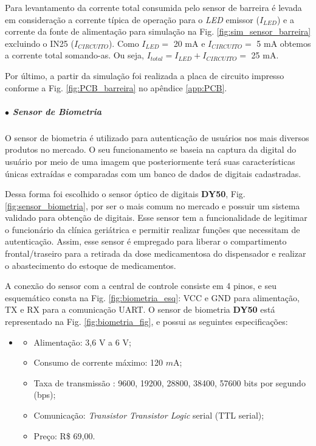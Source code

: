     Para levantamento da corrente total consumida pelo sensor de barreira é levada em consideração a corrente típica de operação para o \textit{LED} emissor ($I_{LED}$) e a corrente da fonte de alimentação para simulação na Fig. \ref{fig:sim_sensor_barreira} excluindo o IN25 ($I_{CIRCUITO}$). Como $I_{LED} =$ 20 mA e $I_{CIRCUITO} =$ 5 mA  obtemos a corrente total somando-as. Ou seja, $I_{total} = I_{LED} + I_{CIRCUITO} =$ 25 mA.  
    
    Por último, a partir da simulação foi realizada a placa de circuito impresso conforme a Fig. \ref{fig:PCB_barreira} no apêndice \ref{app:PCB}.  

    \subparagraph*{$\bullet$ Sensor de Biometria} \hfill
    
    O sensor de biometria é utilizado para autenticação de usuários nos mais diversos produtos no mercado. O seu funcionamento se baseia na captura da digital do usuário por meio de uma imagem que posteriormente terá suas características únicas extraídas e comparadas com um banco de dados de digitais cadastradas. 
    
    Dessa forma foi escolhido o sensor óptico de digitais \textbf{DY50}, Fig. \ref{fig:sensor_biometria}, por ser o mais comum no mercado e possuir um sistema  validado para obtenção de digitais. Esse sensor tem a funcionalidade de legitimar o funcionário da clínica geriátrica e permitir realizar funções que necessitam de autenticação. Assim, esse sensor é empregado para liberar o compartimento frontal/traseiro para a retirada da dose medicamentosa do dispensador e realizar o abastecimento do estoque de medicamentos.
    
   A conexão do sensor com a central de controle consiste em 4 pinos, e seu esquemático consta na Fig. \ref{fig:biometria_esq}: VCC e GND para alimentação, TX e RX para a comunicação UART. O sensor de biometria \textbf{DY50} está representado na Fig. \ref{fig:biometria_fig}, e possui as seguintes especificações:
    
    \begin{itemize}
    \item[ ]
        \begin{itemize}
            \item Alimentação: 3,6 V a 6 V;
            \item Consumo de corrente máximo: 120 $m$A;
            \item Taxa de transmissão : 9600, 19200, 28800, 38400, 57600 bits por segundo (bps);
            \item Comunicação: \textit{Transistor Transistor Logic} serial (TTL serial);
            \item Preço: R\$ 69,00.
        \end{itemize}
    \end{itemize} 
    

